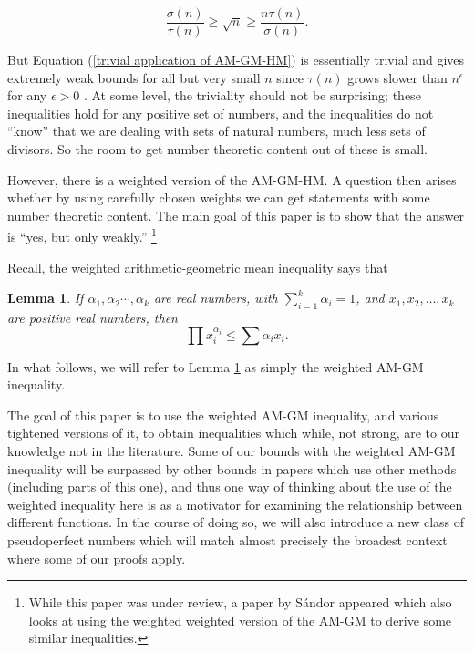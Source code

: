 \documentclass{article}
\newtheorem{lemma}[theorem]{Lemma}
\begin{document}
\begin{equation} \label{trivial application of AM-GM-HM}
 \frac{\sigma(n)}{\tau(n)} \geq \sqrt{n} \geq \frac{n\tau(n)}{\sigma(n)}.
\end{equation}

But Equation (\ref{trivial application of AM-GM-HM}) is essentially trivial and gives extremely weak bounds for all but very small $n$ since $\tau(n)$ grows slower than $n^{\epsilon}$ for any $\epsilon >0$ . At some level, the triviality should not be surprising; these inequalities hold for any positive set of numbers, and the inequalities do not ``know'' that we are dealing with sets of natural numbers, much less sets of divisors. So the room to get number theoretic content out of these is small.

However, there is a weighted version of the AM-GM-HM. A question then arises whether by using carefully chosen weights we can get statements with some number theoretic content. The main goal of this paper is to show that the answer is ``yes, but only weakly.'' \footnote{While this paper was under review, a paper by S\'{a}ndor appeared \cite{Sandor} which also looks at using the weighted weighted version of the AM-GM to derive some similar inequalities.}

Recall, the weighted arithmetic-geometric mean inequality says that 
\begin{lemma} If $\alpha_1, \alpha_2 \cdots ,\alpha_k$ are real numbers, with $\sum_{i=1}^k \alpha_i=1$, and $x_1, x_2, \ldots ,x_k$ are positive real numbers, then \label{Weighted AM GM}
$$\prod x_i^{\alpha_i} \leq \sum \alpha_i x_i.$$
\end{lemma}

In what follows, we will refer to Lemma \ref{Weighted AM GM} as simply the weighted AM-GM inequality. 

The goal of this paper is to use the weighted AM-GM inequality, and various tightened versions of it, to obtain inequalities which while, not strong, are to our knowledge not in the literature. Some of our bounds with the weighted AM-GM inequality will be surpassed by other bounds in papers which use other methods (including parts of this one), and thus one way of thinking about the use of the weighted inequality here is as a motivator for examining the relationship between different functions. In the course of doing so, we will also introduce a new class of pseudoperfect numbers which will match almost precisely the broadest context where some of our proofs apply.
\end{document}
